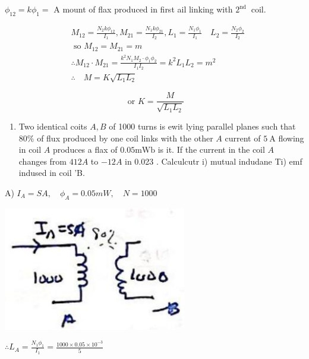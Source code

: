 \documentclass[12pt, a4paper]{article}
\newcommand{\figwidth}{8cm}
\begin{document}
$\phi_{12}=k \phi_{1}=$ A mount of flax produced in first ail linking with $2^{\text {nd }}$ coil.

$$
	\begin{aligned}
		 & M_{12}=\frac{N_{2} k \phi_{12}}{I_{1}}, M_{21}=\frac{N_{1} k \phi_{21}}{I_{2}}, L_{1}=\frac{N_{1} \phi_{1}}{I_{1}} \quad L_{2}=\frac{N_{2} \phi_{2}}{I_{2}} \\
		 & \text { so } M_{12}=M_{21}=m                                                                                                                                \\
		 & \therefore M_{12} \cdot M_{21}=\frac{k^{2} N_{1} M_{2} \cdot \phi_{1} \phi_{2}}{I_{1} I_{2}}=k^{2} L_{1} L_{2}=m^{2}                                        \\
		 & \therefore \quad M=K \sqrt{L_{1} L_{2}}
	\end{aligned}
$$

$$
	\text { or } K=\frac{M}{\sqrt{L_{1} L_{2}}}
$$

\begin{enumerate}
	\item Two identical coits $A, B$ of 1000 turns is ewit lying parallel planes such that $80 \%$ of flux produced by one coil links with the other $A$ current of $5 \mathrm{~A}$ flowing in coil $A$ produces a flax of $0.05 \mathrm{mWb}$ is it. If the current in the coil $A$ changes from $412 A$ to $-12 A$ in 0.023 . Calculcutr i) mutual indudane Ti) emf indused in coil 'B.
\end{enumerate}

A) $I_{A}=S A, \quad \phi_{A}=0.05 m W, \quad N=1000$

\begin{center}
	\includegraphics[max width=\figwidth]{2024_06_15_ae1c13e212c06c234cc4g-10}
\end{center}

$\therefore L_{A}=\frac{N_{1} \phi_{1}}{I_{1}}=\frac{1000 \times 0.05 \times 10^{-3}}{5}$
\end{document}
